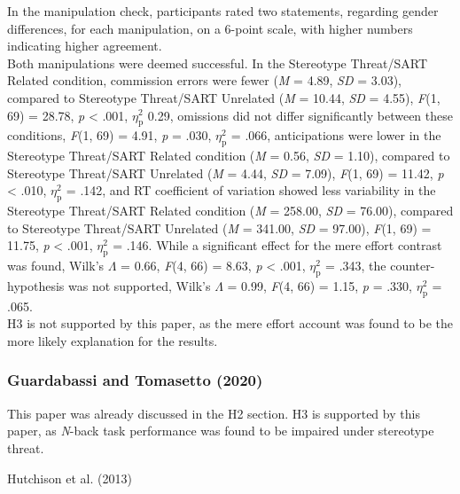 \documentclass[
  stu,floatsintext]{apa7}
\begin{document}
In the manipulation check, participants rated two statements, regarding gender differences, for each manipulation, on a 6-point scale, with higher numbers indicating higher agreement.\\
Both manipulations were deemed successful.
In the Stereotype Threat/SART Related condition, commission errors were fewer (\emph{M} = 4.89, \emph{SD} = 3.03), compared to Stereotype Threat/SART Unrelated (\emph{M} = 10.44, \emph{SD} = 4.55), \emph{F}(1, 69) = 28.78, \emph{p} \textless{} .001, \(\eta^{2}_{\text{p}}\) 0.29, omissions did not differ significantly between these conditions, \emph{F}(1, 69) = 4.91, \emph{p} = .030, \(\eta^{2}_{\text{p}}\) = .066, anticipations were lower in the Stereotype Threat/SART Related condition (\emph{M} = 0.56, \emph{SD} = 1.10), compared to Stereotype Threat/SART Unrelated (\emph{M} = 4.44, \emph{SD} = 7.09), \emph{F}(1, 69) = 11.42, \emph{p} \textless{} .010, \(\eta^{2}_{\text{p}}\) = .142, and RT coefficient of variation showed less variability in the Stereotype Threat/SART Related condition (\emph{M} = 258.00, \emph{SD} = 76.00), compared to Stereotype Threat/SART Unrelated (\emph{M} = 341.00, \emph{SD} = 97.00), \emph{F}(1, 69) = 11.75, \emph{p} \textless{} .001, \(\eta^{2}_{\text{p}}\) = .146.
While a significant effect for the mere effort contrast was found, Wilk's \(\Lambda\) = 0.66, \emph{F}(4, 66) = 8.63, \emph{p} \textless{} .001, \(\eta^{2}_{\text{p}}\) = .343, the counter-hypothesis was not supported, Wilk's \(\Lambda\) = 0.99, \emph{F}(4, 66) = 1.15, \emph{p} = .330, \(\eta^{2}_{\text{p}}\) = .065.\\
H3 is not supported by this paper, as the mere effort account was found to be the more likely explanation for the results.

\subsubsection{Guardabassi and Tomasetto (2020)}\label{guardabassiweightstatusweight2020-1}

This paper was already discussed in the H2 section.
H3 is supported by this paper, as \emph{N}-back task performance was found to be impaired under stereotype threat.

Hutchison et al. (2013)
\end{document}
